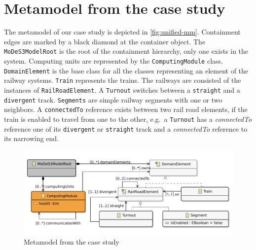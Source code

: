 \section{Metamodel from the case study}

The metamodel of our case study is depicted in \autoref{fig:unified-mm}.
Containment edges are marked by a black diamond at the container object.
The \texttt{MoDeS3ModelRoot} is the root of the containment hierarchy, only one exists in the system. Computing units are represented by the \texttt{ComputingModule} class. \texttt{DomainElement} is the base class for all the classes representing an element of the railway systems. \texttt{Train} represents the trains. The railways are consisted of the instances of \texttt{RailRoadElement}. A  \texttt{Turnout} switches between a \texttt{straight} and a \texttt{divergent} track. \texttt{Segments} are simple railway segments with one or two neighbors. A \texttt{connectedTo} reference exists between two rail road elements, if the train is enabled to travel from one to the other, e.g.\ a \texttt{Turnout} has a \emph{connectedTo} reference one of its \texttt{divergent} or \texttt{straight} track and a \emph{connectedTo} reference to its narrowing end.


\begin{figure}[H]
	\begin{center}
		\includegraphics[width=\textwidth]{figures/unified-mm.pdf}
	\end{center}
	\caption{Metamodel from the case study}
	\label{fig:unified-mm}
\end{figure}


